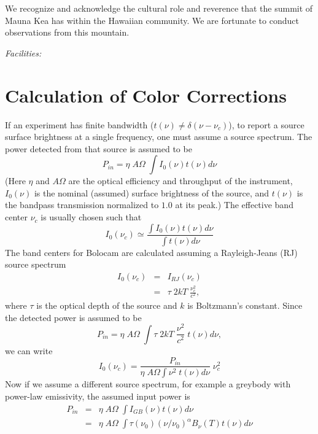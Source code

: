 \documentclass[12pt,preprint]{aastex}
\begin{document}
We recognize and acknowledge the cultural role and reverence that the
summit of Mauna Kea has within the Hawaiian community. We are
fortunate to conduct observations from this mountain.

{\it Facilities:} 

\appendix

\section{Calculation of Color Corrections}
\label{app:ColorCorrections}

If an experiment has finite bandwidth ($t(\nu) \ne \delta(\nu -
\nu_c)$), to report a source surface brightness at a single
frequency, one must assume a source spectrum.  The power detected from
that source is assumed to be
\begin{equation}
P_{in} = \eta \; A \Omega \; \int I_0(\nu) t(\nu) d \nu
\end{equation}
(Here $\eta$ and $A \Omega$ are the optical efficiency and throughput
of the instrument, $I_0(\nu)$ is the nominal (assumed) surface
brightness of the source, and $t(\nu)$ is the bandpass transmission
normalized to $1.0$ at its peak.)  The effective band center $\nu_c$
is usually chosen such that
\begin{equation}
I_0(\nu_c) \simeq \frac{\int I_0(\nu) t(\nu) d \nu}
{\int t(\nu) d \nu} 
\end{equation}
The band centers for Bolocam are calculated assuming a Rayleigh-Jeans
(RJ) source spectrum
\begin{eqnarray}
I_0(\nu_c) & = & I_{RJ}(\nu_c) \\
\nonumber & = & \tau \; 2 k T \; \frac{\nu_c^2}{c^2},
\end{eqnarray}
where $\tau$ is the optical depth of the source and $k$ is Boltzmann's
constant.  Since the detected power is assumed to be
\begin{equation}
P_{in} = \eta \; A \Omega \; \int \tau \; 2 k T \; \frac{\nu^2}{c^2}
\; t(\nu) d \nu,
\end{equation}
we can write
\begin{equation}
I_0(\nu_c) = \frac{P_{in}}{\eta \; A \Omega \int \nu^2 \; t(\nu) d \nu} \; \nu_c^2
\end{equation}
Now if we assume a different source spectrum, for example a greybody
with power-law emissivity, the assumed input power is
\begin{eqnarray}
P_{in} & = & \eta \; A \Omega \; \int I_{GB}(\nu) t(\nu) d \nu \\
\nonumber & = & \eta \; A \Omega \; \int \tau(\nu_0) (\nu / \nu_0)^\alpha B_\nu(T) t(\nu) d \nu
\end{eqnarray}
\end{document}
